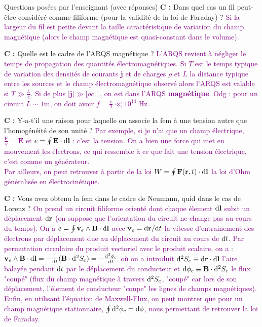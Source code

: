 \begin{reportBlock}{Questions posées par l’enseignant (avec réponses)}
  \textbf{C :} Dans quel cas un fil peut-être considéré comme filiforme (pour la validité de la loi de Faraday) ? \textcolor{purple}{Si la largeur du fil est petite devant la taille caractéristique de variation du champ magnétique (alors le champ magnétique est quasi-constant dans le volume).} \newline
  
  \textbf{C :} Quelle est le cadre de l'ARQS magnétique ? \textcolor{purple}{L'ARQS revient à négliger le temps de propagation des quantités électromagnétiques. Si $T$ est le temps typique de variation des densités de courants $\mathbf j$ et de charges $\rho$ et $L$ la distance typique entre les sources et le champ électromagnétique observé alors l'ARQS est valable si $T \gg \frac{L}{c}$. Si de plus $\mid \mathbf j \mid \gg \mid \rho c \mid$, on est dans l'ARQS \textbf{magnétique}. Odg : pour un circuit $L \sim 1$m, on doit avoir $f = \frac{c}{T} \ll 10^{14}$ Hz.} \newline
  
  \textbf{C :} Y-a-t'il une raison pour laquelle on associe la fem à une tension autre que l'homogénéité de son unité ? \textcolor{purple}{Par exemple, si je n'ai que un champ électrique, $\frac{\mathbf F}{q} = \mathbf E$ et $e = \oint \mathbf E \cdot \mathrm{d} \mathbf l$ : c'est la tension. On a bien une force qui met en mouvement les électrons, ce qui ressemble à ce que fait une tension électrique, c'est comme un générateur. \\
  Par ailleurs, on peut retrouver à partir de la loi $W = \oint \mathbf{F}(\mathbf{r},t) \cdot \mathrm{d} \mathbf l$ la loi d'Ohm généralisée en électrocinétique.} \newline
  
  \textbf{C :} Vous avez obtenu la fem dans le cadre de Neumann, quid dans le cas de Lorenz ? \textcolor{purple}{On prend un circuit filiforme orienté dont chaque élement $\mathrm{d} \mathbf l$ subit un déplacement $\mathrm{d} \mathbf r$ (on suppose que l'orientation du circuit ne change pas au cours du temps). On a $e = \oint \mathbf{v}_e\land\mathbf{B} \cdot \mathrm{d} \mathbf l$ avec $\mathbf{v}_e = \mathrm {d} \mathbf{r}/\mathrm {d} t$ la vitesse d'entrainement des électrons par déplacement due au déplacement du circuit au cours de $\mathrm {d} t$. Par permutation circulaire du produit vectoriel avec le produit scalaire, on a : $\mathbf{v}_e\land\mathbf{B} \cdot \mathrm{d} \mathbf l = - \frac{1}{\mathrm{d} t} (\mathbf{B} \cdot \mathrm{d}^2 S_c) = - \frac{\mathrm{d}^2 \phi_c}{\mathrm{d} t}$ où on a introduit $\mathrm {d}^2 S_c \equiv \mathrm {d} \mathbf{r} \cdot \mathrm {d} \mathbf l$ l'aire balayée pendant $\mathrm{d} t$ par le déplacement du conducteur et $\mathrm{d} \phi_c \equiv \mathbf B \cdot \mathrm {d}^2 S_c$ le flux "coupé" (flux du champ magnétique à travers $\mathrm {d}^2 S_c$, "coupé" car lors de son déplacement, l'élement de conducteur "coupe" les lignes de champs magnétiques). Enfin, en utilisant l'équation de Maxwell-Flux, on peut montrer que pour un champ magnétique stationnaire, $\oint \mathrm{d}^2 \phi_c = \mathrm{d} \phi$, nous permettant de retrouver la loi de Faraday.} \newline
  

\end{reportBlock}
